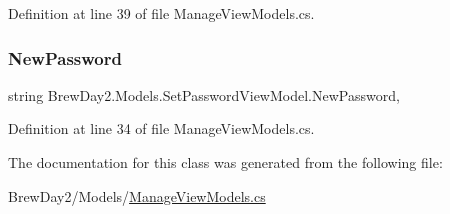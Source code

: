 Definition at line 39 of file Manage\+View\+Models.\+cs.

\mbox{\label{class_brew_day2_1_1_models_1_1_set_password_view_model_a9003c09107a247fe17f123205eec0c77}} 
\subsubsection{\texorpdfstring{New\+Password}{NewPassword}}
{\footnotesize\ttfamily string Brew\+Day2.\+Models.\+Set\+Password\+View\+Model.\+New\+Password\hspace{0.3cm}{\ttfamily [get]}, {\ttfamily [set]}}



Definition at line 34 of file Manage\+View\+Models.\+cs.



The documentation for this class was generated from the following file\+:\begin{DoxyCompactItemize}
\item 
Brew\+Day2/\+Models/\mbox{\hyperlink{_manage_view_models_8cs}{Manage\+View\+Models.\+cs}}\end{DoxyCompactItemize}
